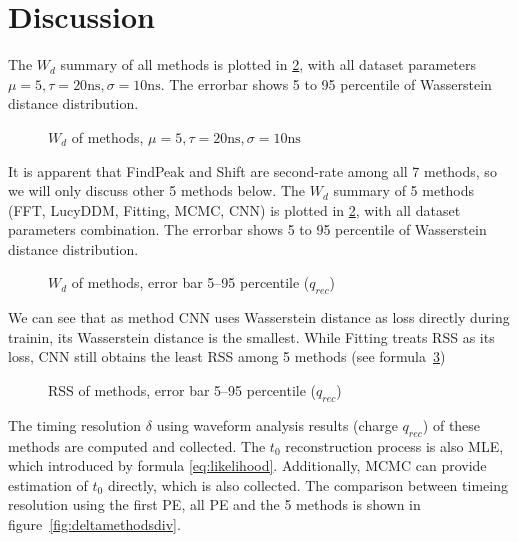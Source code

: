 \section{Discussion} %
\label{sec:discussion}

The $W_{d}$ summary of all methods is plotted in \ref{fig:chargesummary}, with all dataset parameters $\mu=5, \tau=20\mathrm{ns}, \sigma=10\mathrm{ns}$. The errorbar shows 5 to 95 percentile of Wasserstein distance distribution. 

\begin{figure}[H]
    \centering
    \scalebox{0.6}{}
    \caption{\label{fig:chargesummary} $W_{d}$ of methods, $\mu=5, \tau=20\mathrm{ns}, \sigma=10\mathrm{ns}$}
\end{figure}

It is apparent that FindPeak and Shift are second-rate among all 7 methods, so we will only discuss other 5 methods below. The $W_{d}$ summary of 5 methods (FFT, LucyDDM, Fitting, MCMC, CNN) is plotted in \ref{fig:chargesummary}, with all dataset parameters combination. The errorbar shows 5 to 95 percentile of Wasserstein distance distribution. 

\begin{figure}[H]
    \centering
    \resizebox{\textwidth}{!}{}
    \caption{\label{fig:chargesummary} $W_{d}$ of methods, error bar 5--95 percentile ($q_{rec}$)}
\end{figure}

We can see that as method CNN uses Wasserstein distance as loss directly during trainin, its Wasserstein distance is the smallest. While Fitting treats RSS as its loss, CNN still obtains the least RSS among 5 methods (see formula~\ref{fig:rsssummary})

\begin{figure}[H]
    \centering
    \resizebox{\textwidth}{!}{}
    \caption{\label{fig:rsssummary} RSS of methods, error bar 5--95 percentile ($q_{rec}$)}
\end{figure}

The timing resolution $\delta$ using waveform analysis results (charge $q_{rec}$) of these methods are computed and collected. The $t_{0}$ reconstruction process is also MLE, which introduced by formula \eqref{eq:likelihood}. Additionally, MCMC can provide estimation of $t_{0}$ directly, which is also collected. The comparison between timeing resolution using the first PE, all PE and the 5 methods is shown in figure~\ref{fig:deltamethodsdiv}. 

